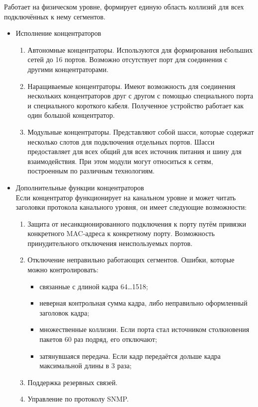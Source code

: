 \documentclass[12pt, russian, oneside, article]{ncc}
\begin{document}
Работает на физическом уровне, формирует единую область коллизий для всех подключённых к нему сегментов.
\begin{itemize}

\item Исполнение концентраторов\\
\label{sec-4_8_2_1}%
\begin{enumerate}
\item Автономные концентраторы. Используются для формирования небольших сетей до 16 портов. Возможно отсутствует порт для соединения с другими концентраторами.
\item Наращиваемые концентраторы. Имеют возможность для соединения нескольких концентраторов друг с другом с помощью специального порта и специального короткого кабеля. Полученное устройство работает как один большой концентратор.
\item Модульные концентраторы. Представляют собой шасси, которые содержат несколько слотов для подключения отдельных портов. Шасси предоставляет для всех общий для всех источник питания и шину для взаимодействия. При этом модули могут относиться к сетям, построенным по различным технологиям.
\end{enumerate}


\item Дополнительные функции концентраторов\\
\label{sec-4_8_2_2}%
Если концентратор функционирует на канальном уровне и может читать заголовки протокола канального уровня, он имеет следующие возможности:
\begin{enumerate}
\item Защита от несанкционированного подключения к порту путём привязки конкретного MAC-адреса к конкретному порту. Возможность принудительного отключения неиспользуемых портов.
\item Отключение неправильно работающих сегментов. Ошибки, которые можно контролировать:

\begin{itemize}
\item связанные с длиной кадра 64\ldots{}1518;
\item неверная контрольная сумма кадра, либо неправильно оформленный заголовок кадра;
\item множественные коллизии. Если порта стал источником столкновения пакетов 60 раз подряд, его отключают;
\item затянувшаяся передача. Если кадр передаётся дольше кадра максимальной длины в 3 раза;
\end{itemize}

\item Поддержка резервных связей.
\item Управление по протоколу SNMP.
\end{enumerate}

\end{itemize} %
\end{document}
